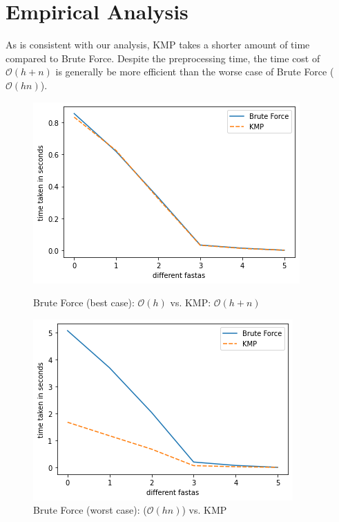 \section*{Empirical Analysis}

As is consistent with our analysis, KMP takes a shorter amount of time compared to Brute Force. Despite the preprocessing time, the time cost of $\mathcal{O}(h+n)$ is generally be more efficient than the worse case of Brute Force ($\mathcal{O}(hn)$).

\begin{figure}[H]
  \centering
  \begin{minipage}[b]{0.49\textwidth}
    \includegraphics[width=\textwidth]{images/brute-force-best.png} 
    \caption{Brute Force (best case): $\mathcal{O}(h)$ vs. KMP: $\mathcal{O}(h+n)$}
    \label{fig:bf_best}
  \end{minipage}
  \hfill
  \begin{minipage}[b]{0.49\textwidth}
    \includegraphics[width=\textwidth]{images/brute-force-worst.png} 
    \caption{Brute Force (worst case): ($\mathcal{O}(hn)$) vs. KMP}
    \label{fig:bf_worst}
  \end{minipage}
\end{figure}

